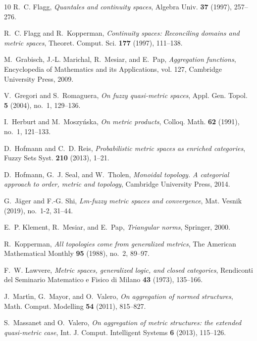 \documentclass[11pt,a4paper]{amsart}
\theoremstyle{definition}
\begin{document}
\begin{thebibliography}{10}
		R.~C. Flagg, \emph{Quantales and continuity spaces}, Algebra Univ. \textbf{37}
		(1997), 257--276.
		
		R.~C. Flagg and R.~Kopperman, \emph{Continuity spaces: {R}econciling domains
			and metric spaces}, Theoret. Comput. Sci. \textbf{177} (1997), 111--138.
		
		M.~Grabisch, J.-L. Marichal, R.~Mesiar, and E.~Pap, \emph{Aggregation
			functions}, Encyclopedia of Mathematics and its Applications, vol. 127,
		Cambridge University Press, 2009.
		
		V.~Gregori and S.~Romaguera, \emph{On fuzzy quasi-metric spaces}, Appl. Gen.
		Topol. \textbf{5} (2004), no.~1, 129--136.
		
		I.~Herburt and M.~Moszy\'nska, \emph{On metric products}, Colloq. Math.
		\textbf{62} (1991), no.~1, 121--133.
		
		D.~Hofmann and C.~D. Reis, \emph{Probabilistic metric spaces as enriched
			categories}, Fuzzy Sets Syst. \textbf{210} (2013), 1--21.
		
		D.~Hofmann, G.~J. Seal, and W.~Tholen, \emph{Monoidal topology. {A} categorial
			approach to order, metric and topology}, Cambridge University Press, 2014.
		
		G.~J\"ager and F.-G. Shi, \emph{Lm-fuzzy metric spaces and convergence}, Mat.
		Vesnik (2019), no.~1-2, 31--44.
		
		E.~P. Klement, R.~Mesiar, and E.~Pap, \emph{Triangular norms}, Springer, 2000.
		
		R.~Kopperman, \emph{All topologies come from generalized metrics}, The American
		Mathematical Monthly \textbf{95} (1988), no.~2, 89--97.
		
		F.~W. Lawvere, \emph{Metric spaces, generalized logic, and closed categories},
		Rendiconti del Seminario Matematico e Fisico di Milano \textbf{43} (1973),
		135--166.
		
		J.~Mart\'{\i}n, G.~Mayor, and O.~Valero, \emph{On aggregation of normed
			structures}, Math. Comput. Modelling \textbf{54} (2011), 815--827.
		
		S.~Massanet and O.~Valero, \emph{On aggregation of metric structures: the
			extended quasi-metric case}, Int. J. Comput. Intelligent Systems \textbf{6}
		(2013), 115--126.
		

\end{thebibliography}
\end{document}
